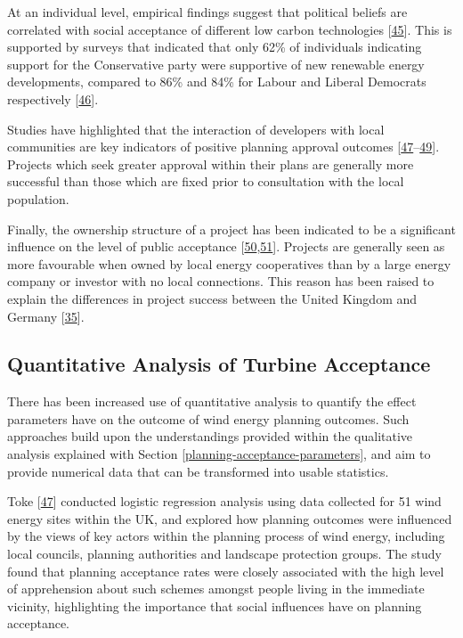 \documentclass[a4paper,]{article}
\theoremstyle{definition}
\theoremstyle{definition}
\theoremstyle{definition}
\theoremstyle{remark}
\begin{document}
At an individual level, empirical findings suggest that political
beliefs are correlated with social acceptance of different low carbon
technologies {[}\protect\hyperlink{ref-Devine-Wright2007}{45}{]}. This
is supported by surveys that indicated that only 62\% of individuals
indicating support for the Conservative party were supportive of new
renewable energy developments, compared to 86\% and 84\% for Labour and
Liberal Democrats respectively
{[}\protect\hyperlink{ref-Populus2005}{46}{]}.

Studies have highlighted that the interaction of developers with local
communities are key indicators of positive planning approval outcomes
{[}\protect\hyperlink{ref-Toke2005}{47}--\protect\hyperlink{ref-Wustenhagen2007}{49}{]}.
Projects which seek greater approval within their plans are generally
more successful than those which are fixed prior to consultation with
the local population.

Finally, the ownership structure of a project has been indicated to be a
significant influence on the level of public acceptance
{[}\protect\hyperlink{ref-Sonnberger2017}{50},\protect\hyperlink{ref-Haggett2006}{51}{]}.
Projects are generally seen as more favourable when owned by local
energy cooperatives than by a large energy company or investor with no
local connections. This reason has been raised to explain the
differences in project success between the United Kingdom and Germany
{[}\protect\hyperlink{ref-Toke2008}{35}{]}.

\subsection{Quantitative Analysis of Turbine
Acceptance}\label{quantitative-analysis-of-turbine-acceptance}

There has been increased use of quantitative analysis to quantify the
effect parameters have on the outcome of wind energy planning outcomes.
Such approaches build upon the understandings provided within the
qualitative analysis explained with Section
\ref{planning-acceptance-parameters}, and aim to provide numerical data
that can be transformed into usable statistics.

Toke {[}\protect\hyperlink{ref-Toke2005}{47}{]} conducted logistic
regression analysis using data collected for 51 wind energy sites within
the UK, and explored how planning outcomes were influenced by the views
of key actors within the planning process of wind energy, including
local councils, planning authorities and landscape protection groups.
The study found that planning acceptance rates were closely associated
with the high level of apprehension about such schemes amongst people
living in the immediate vicinity, highlighting the importance that
social influences have on planning acceptance.
\end{document}
